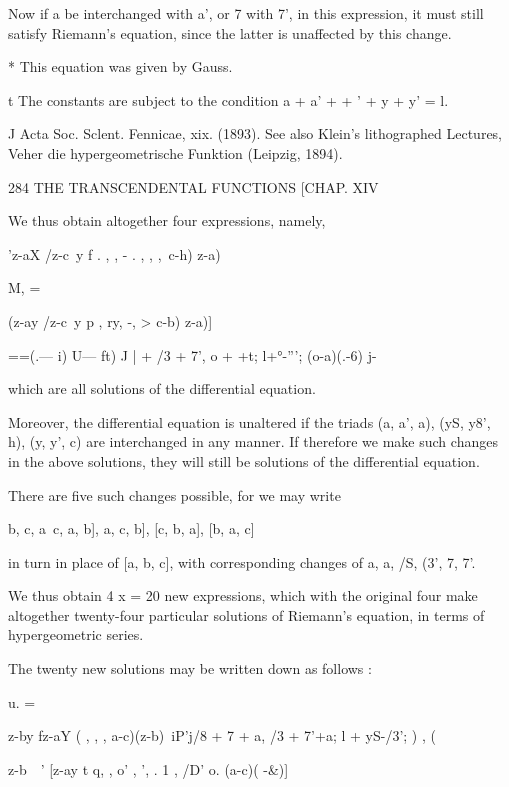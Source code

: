 Now if a be interchanged with a', or 7 with 7', in this expression, it must 
still satisfy Riemann's equation, since the latter is unaffected by this change. 

* This equation was given by Gauss. 

t The constants are subject to the condition a + a' +   +  ' + y + y' = l. 

J Acta Soc. Sclent. Fennicae, xix. (1893). See also Klein's lithographed Lectures, Veher die 
hypergeometrische Funktion (Leipzig, 1894). 



284 THE TRANSCENDENTAL FUNCTIONS [CHAP. XIV 

We thus obtain altogether four expressions, namely, 

'z-aX /z-c\ y  f .  , ,  - . , , ,\  c-h) z-a)\ 



M, = 



(z-ay /z-c\ y p ,   ry, -, >  c-b) z-a)] 

 ==(.— i) U— ft) J |  + /3 + 7', o +  +t; l+°-'''; (o-a)(.-6) j- 

which are all solutions of the differential equation. 

Moreover, the differential equation is unaltered if the triads (a, a', a), 
(yS, y8', h), (y, y', c) are interchanged in any manner. If therefore we make 
such changes in the above solutions, they will still be solutions of the 
differential equation. 

There are five such changes possible, for we may write 

 b, c, a\,  c, a, b],  a, c, b], [c, b, a], [b, a, c] 

in turn in place of [a, b, c], with corresponding changes of a, a, /S, (3', 7, 7'. 

We thus obtain 4 x = 20 new expressions, which with the original four 
make altogether twenty-four particular solutions of Riemann's equation, in 
terms of hypergeometric series. 

The twenty new solutions may be written down as follows : 



u. = 



z-by fz-aY  (  , ,  ,  a-c)(z-b)\ 
iP'j/8 + 7 + a, /3 + 7'+a; l + yS-/3'; )  , ( 

z-b\ \  ' [z-ay t  q,  ,   o' , ',  . 1 , /D' o. (a-c)( -\&)] 



